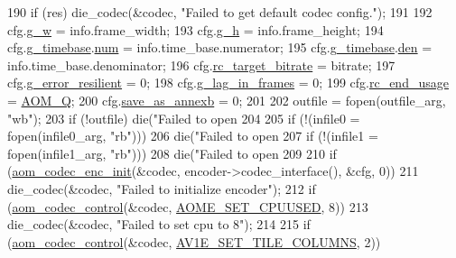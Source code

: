 \begin{DoxyCodeInclude}
{{{{190   \textcolor{keywordflow}{if} (res) die\_codec(&codec, \textcolor{stringliteral}{"Failed to get default codec config."});
191 
192   cfg.\hyperlink{structaom__codec__enc__cfg_a80cb459c5ef3c7e1516f617c4c9d6eab}{g\_w} = info.frame\_width;
193   cfg.\hyperlink{structaom__codec__enc__cfg_a37b0f57b63bec8d133df8901d4407ee6}{g\_h} = info.frame\_height;
194   cfg.\hyperlink{structaom__codec__enc__cfg_a10664f1fc5b6ec29b77ee13efeeecdf7}{g\_timebase}.\hyperlink{structaom__rational_a7b48174411798c780a15f132c4650839}{num} = info.time\_base.numerator;
195   cfg.\hyperlink{structaom__codec__enc__cfg_a10664f1fc5b6ec29b77ee13efeeecdf7}{g\_timebase}.\hyperlink{structaom__rational_adeddf2ea01c12b7be66536e0a0fb92c5}{den} = info.time\_base.denominator;
196   cfg.\hyperlink{structaom__codec__enc__cfg_ab21539da477dba7506d90353c27d218b}{rc\_target\_bitrate} = bitrate;
197   cfg.\hyperlink{structaom__codec__enc__cfg_a8f3763485bb1f6eea6466b2fe0da2304}{g\_error\_resilient} = 0;
198   cfg.\hyperlink{structaom__codec__enc__cfg_a614a49318f2011cc8735d7e51b910fa4}{g\_lag\_in\_frames} = 0;
199   cfg.\hyperlink{structaom__codec__enc__cfg_a3fd74d888658039d09bc4eacf163a495}{rc\_end\_usage} = \hyperlink{group__encoder_gga7c084d3ecef569aad166ce70b0e8a957aff3bbd4fe870b4b946c2093e59eb14e5}{AOM\_Q};
200   cfg.\hyperlink{structaom__codec__enc__cfg_adb3fe41c1ce39579a49b97bc2ca7b2f2}{save\_as\_annexb} = 0;
201 
202   outfile = fopen(outfile\_arg, \textcolor{stringliteral}{"wb"});
203   \textcolor{keywordflow}{if} (!outfile) die(\textcolor{stringliteral}{"Failed to open %
204 
205   \textcolor{keywordflow}{if} (!(infile0 = fopen(infile0\_arg, \textcolor{stringliteral}{"rb"})))
206     die(\textcolor{stringliteral}{"Failed to open %
207   \textcolor{keywordflow}{if} (!(infile1 = fopen(infile1\_arg, \textcolor{stringliteral}{"rb"})))
208     die(\textcolor{stringliteral}{"Failed to open %
209 
210   \textcolor{keywordflow}{if} (\hyperlink{group__encoder_gaade68a7d33d30f97dc9a596aa5e065d8}{aom\_codec\_enc\_init}(&codec, encoder->codec\_interface(), &cfg, 0))
211     die\_codec(&codec, \textcolor{stringliteral}{"Failed to initialize encoder"});
212   \textcolor{keywordflow}{if} (\hyperlink{group__codec_ga6da974f4eeaba1fa74106b28d0fe6ac5}{aom\_codec\_control}(&codec, \hyperlink{group__aom__encoder_ggae78dde67a6d78f332e9bdba0dde42db5adac09e1a8da079b08fca5ccbf981f1a6}{AOME\_SET\_CPUUSED}, 8))
213     die\_codec(&codec, \textcolor{stringliteral}{"Failed to set cpu to 8"});
214 
215   \textcolor{keywordflow}{if} (\hyperlink{group__codec_ga6da974f4eeaba1fa74106b28d0fe6ac5}{aom\_codec\_control}(&codec, \hyperlink{group__aom__encoder_ggae78dde67a6d78f332e9bdba0dde42db5acf4ab1ff2fa8d76a78881ad7f1a1294d}{AV1E\_SET\_TILE\_COLUMNS}, 2))
}}}}}}}
\end{DoxyCodeInclude}
